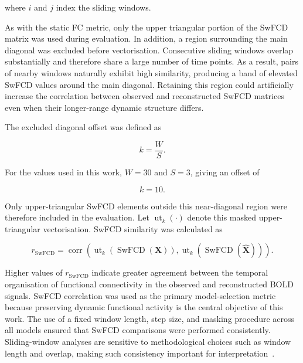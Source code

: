 where $i$ and $j$ index the sliding windows.

As with the static FC metric, only the upper triangular portion of the
SwFCD matrix was used during evaluation. In addition, a region surrounding
the main diagonal was excluded before vectorisation. Consecutive
sliding windows overlap substantially and therefore share a large number
of time points. As a result, pairs of nearby windows naturally exhibit high
similarity, producing a band of elevated SwFCD values around the main
diagonal. Retaining this region could artificially increase the correlation
between observed and reconstructed SwFCD matrices even when their
longer-range dynamic structure differs.

The excluded diagonal offset was defined as

\begin{equation}
    k
    =
    \frac{W}{S}.
\end{equation}

For the values used in this work,
$W=30$ and $S=3$, giving an offset of

\begin{equation}
    k = 10.
\end{equation}

Only upper-triangular SwFCD elements outside this near-diagonal region were
therefore included in the evaluation. Let
$\operatorname{ut}_{k}(\cdot)$ denote this masked upper-triangular
vectorisation. SwFCD similarity was calculated as

\begin{equation}
    r_{\mathrm{SwFCD}}
    =
    \operatorname{corr}
    \left(
        \operatorname{ut}_{k}
        \left(
            \operatorname{SwFCD}(\mathbf{X})
        \right),
        \operatorname{ut}_{k}
        \left(
            \operatorname{SwFCD}(\hat{\mathbf{X}})
        \right)
    \right).
\end{equation}

Higher values of $r_{\mathrm{SwFCD}}$ indicate greater agreement between the
temporal organisation of functional connectivity in the observed and
reconstructed BOLD signals. SwFCD correlation was used as the primary
model-selection metric because preserving dynamic functional activity is
the central objective of this work. The use of a fixed window length, step
size, and masking procedure across all models ensured that SwFCD comparisons
were performed consistently. Sliding-window analyses are sensitive to
methodological choices such as window length and overlap, making such
consistency important for interpretation~\cite{Hutchison2013}.

